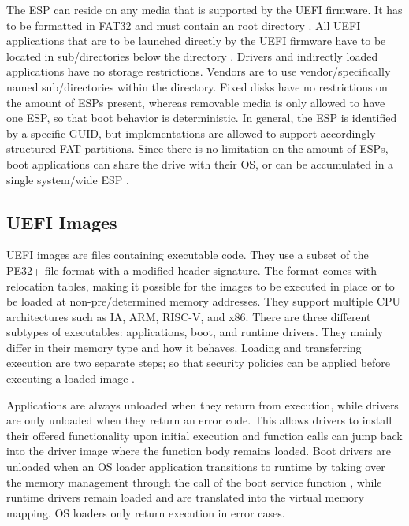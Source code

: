 The \ac{ESP} can reside on any media that is supported by the \ac{UEFI} firmware.
It has to be formatted in \ac{FAT}32 \cite[Section 13.3]{uefi-spec} and must contain an  root directory \cite[Section 13.3.1.3]{uefi-spec}.
All \ac{UEFI} applications that are to be launched directly by the \ac{UEFI} firmware have to be located in sub\-/directories below the  directory \cite[Section 13.3.1.3]{uefi-spec}.
Drivers and indirectly loaded applications have no storage restrictions.
Vendors are to use vendor\-/specifically named sub\-/directories within the  directory.
Fixed disks have no restrictions on the amount of \acp{ESP} present, whereas removable media is only allowed to have one \ac{ESP}, so that boot behavior is deterministic.
In general, the \ac{ESP} is identified by a specific \ac{GUID}, but implementations are allowed to support accordingly structured \ac{FAT} partitions.
Since there is no limitation on the amount of \acp{ESP}, boot applications can share the drive with their \ac{OS}, or can be accumulated in a single system\-/wide \ac{ESP} \cite[Section 13.3.3]{uefi-spec}.

\subsection{\acs{UEFI} Images}

\ac{UEFI} images are files containing executable code. They use a subset of the \ac{PE32}+ file format with a modified header signature.
The format comes with relocation tables, making it possible for the images to be executed in place or to be loaded at non-pre\-/determined memory addresses.
They support multiple CPU architectures such as IA, ARM, RISC-V, and x86.
There are three different subtypes of executables: applications, boot, and runtime drivers. They mainly differ in their memory type and how it behaves.
Loading and transferring execution are two separate steps; so that security policies can be applied before executing a loaded image \cite[Section 2.1.1]{uefi-spec}.

Applications are always unloaded when they return from execution, while drivers are only unloaded when they return an error code. This allows drivers to install their offered functionality upon initial execution and function calls can jump back into the driver image where the function body remains loaded.
Boot drivers are unloaded when an \ac{OS} loader application transitions to runtime by taking over the memory management through the call of the boot service function , while runtime drivers remain loaded and are translated into the virtual memory mapping. \ac{OS} loaders only return execution in error cases.

